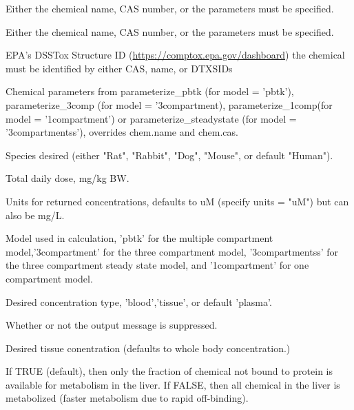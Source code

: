 \documentclass[a4paper]{book}
\begin{document}
\begin{Arguments}
\begin{ldescription}
\item[\code{chem.name}] Either the chemical name, CAS number, or the parameters must 
be specified.

\item[\code{chem.cas}] Either the chemical name, CAS number, or the parameters must 
be specified.

\item[\code{dtxsid}] EPA's DSSTox Structure ID (\url{https://comptox.epa.gov/dashboard})
the chemical must be identified by either CAS, name, or DTXSIDs

\item[\code{parameters}] Chemical parameters from parameterize\_pbtk (for model = 
'pbtk'), parameterize\_3comp (for model = '3compartment), 
parameterize\_1comp(for model = '1compartment') or parameterize\_steadystate 
(for model = '3compartmentss'), overrides chem.name and chem.cas.

\item[\code{species}] Species desired (either "Rat", "Rabbit", "Dog", "Mouse", or
default "Human").

\item[\code{daily.dose}] Total daily dose, mg/kg BW.

\item[\code{output.units}] Units for returned concentrations, defaults to uM 
(specify units = "uM") but can also be mg/L.

\item[\code{model}] Model used in calculation, 'pbtk' for the multiple compartment 
model,'3compartment' for the three compartment model, '3compartmentss' for 
the three compartment steady state model, and '1compartment' for one 
compartment model.

\item[\code{concentration}] Desired concentration type, 'blood','tissue', or default 'plasma'.

\item[\code{suppress.messages}] Whether or not the output message is suppressed.

\item[\code{tissue}] Desired tissue conentration (defaults to whole body 
concentration.)

\item[\code{restrictive.clearance}] If TRUE (default), then only the fraction of
chemical not bound to protein is available for metabolism in the liver. If 
FALSE, then all chemical in the liver is metabolized (faster metabolism due
to rapid off-binding).


\end{ldescription}
\end{Arguments}
\end{document}

